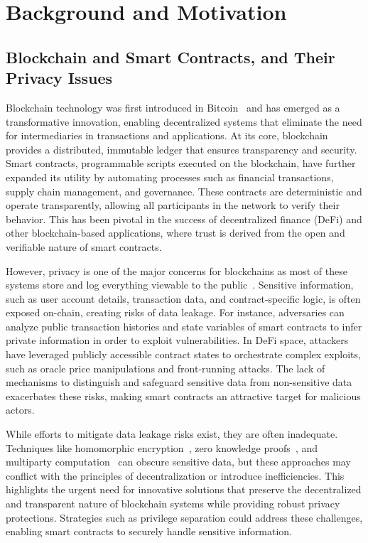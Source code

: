 \section{Background and Motivation}
\label{sec:background}
\subsection{Blockchain and Smart Contracts, and Their Privacy Issues}
Blockchain technology was first introduced in Bitcoin~\cite{nakamoto2008bitcoin} and has emerged as a transformative innovation, enabling decentralized systems that eliminate the need for intermediaries in transactions and applications. At its core, blockchain provides a distributed, immutable ledger that ensures transparency and security. Smart contracts, programmable scripts executed on the blockchain, have further expanded its utility by automating processes such as financial transactions, supply chain management, and governance. These contracts are deterministic and operate transparently, allowing all participants in the network to verify their behavior. This has been pivotal in the success of decentralized finance (DeFi) and other blockchain-based applications, where trust is derived from the open and verifiable nature of smart contracts.

However, privacy is one of the major concerns for blockchains as most of these systems store and log everything viewable to the public~\cite{almashaqbeh2022sok}.
Sensitive information, such as user account details, transaction data, and contract-specific logic, is often exposed on-chain, creating risks of data leakage. For instance, adversaries can analyze public transaction histories and state variables of smart contracts to infer private information in order to exploit vulnerabilities. 
In DeFi space, attackers have leveraged publicly accessible contract states to orchestrate complex exploits, such as oracle price manipulations and front-running attacks. The lack of mechanisms to distinguish and safeguard sensitive data from non-sensitive data exacerbates these risks, making smart contracts an attractive target for malicious actors.

While efforts to mitigate data leakage risks exist, they are often inadequate. Techniques like homomorphic encryption~\cite{solomon2023smartfhe}, zero knowledge proofs~\cite{kosba2016hawk}, and multiparty computation~\cite{ren2022cloak} can obscure sensitive data, but these approaches may conflict with the principles of decentralization or introduce inefficiencies. This highlights the urgent need for innovative solutions that preserve the decentralized and transparent nature of blockchain systems while providing robust privacy protections. 
Strategies such as privilege separation could address these challenges, enabling smart contracts to securely handle sensitive information. 

